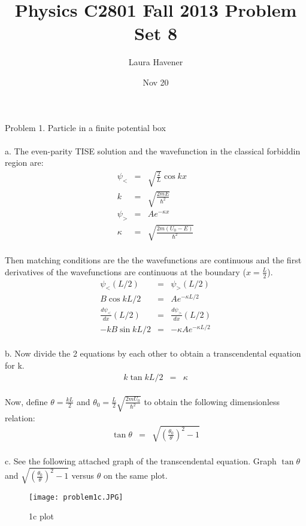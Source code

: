 \documentclass[11pt]{amsart}
\title{Physics C2801 Fall 2013 Problem Set 8}
\author{Laura Havener}
\date{Nov 20} %
\begin{document}
\maketitle

Problem 1. Particle in a finite potential box \\ \\
a. The even-parity TISE solution and the wavefunction in the classical forbiddin region are: \\
\begin{eqnarray*}
\psi_{<} &=& \sqrt{\frac{2}{L}}\cos{kx} \\
k &=& \sqrt{\frac{2mE}{\hbar^{2}}} \\
\psi_{>} &=& Ae^{-\kappa{x}} \\
\kappa &=& \sqrt{\frac{2m(U_{0}-E)}{\hbar^{2}}} 
\end{eqnarray*} \\
Then matching conditions are the the wavefunctions are continuous and the first derivatives of the wavefunctions are continuous at the boundary ($x=\frac{L}{2}$). \\
\begin{eqnarray*}
\psi_{<}(L/2) &=& \psi_{>}(L/2) \\
B\cos{kL/2} &=& Ae^{-\kappa{L/2}} \\
\frac{d\psi_{<}}{dx}(L/2) &=& \frac{d\psi_{>}}{dx}(L/2) \\
-kB\sin{kL/2} &=& -\kappa{A}e^{-\kappa{L/2}} 
\end{eqnarray*} \\
b. Now divide the 2 equations by each other to obtain a transcendental equation for k. \\
\begin{eqnarray*} 
k\tan{kL/2} &=& \kappa 
\end{eqnarray*} \\
Now, define $\theta=\frac{kL}{2}$ and $\theta_{0}=\frac{L}{2}\sqrt{\frac{2mU_{0}}{\hbar^{2}}}$ to obtain the following dimensionless relation: \\
\begin{eqnarray*}
\tan{\theta} &=& \sqrt{(\frac{\theta_{0}}{\theta})^{2}-1} 
\end{eqnarray*} \\
c. See the following attached graph of the transcendental equation. Graph $\tan{\theta}$ and $\sqrt{(\frac{\theta_{0}}{\theta})^{2}-1}$ versus $\theta$ on the same plot. \\
\begin{figure}[htb]
\texttt{[image: problem1c.JPG]}
\caption{1c plot}
\label{problem1c}
\end{figure} 
\end{document}
